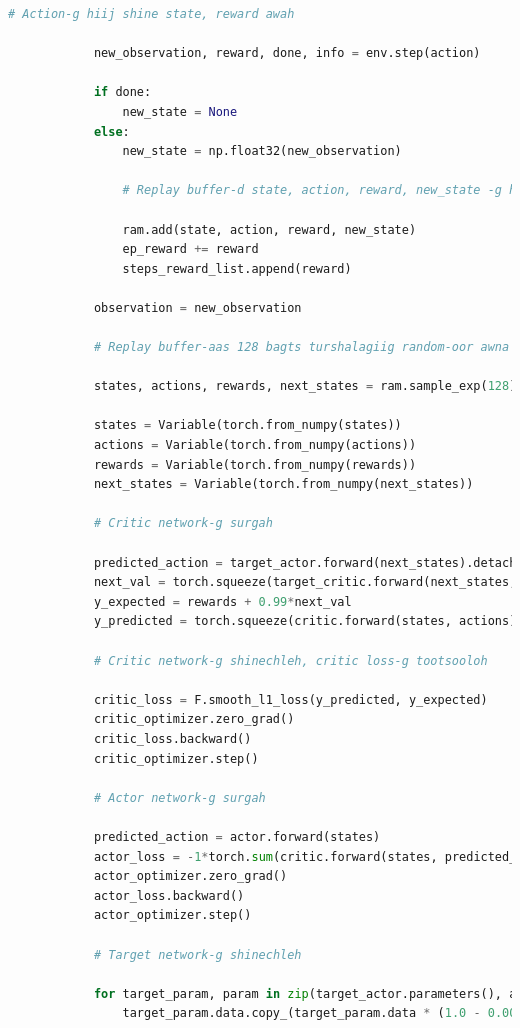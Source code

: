 \documentclass[12pt,A4]{report}
\begin{document}
\begin{lstlisting}[language=Python, caption=main.py, frame=single]
            # Action-g hiij shine state, reward awah

            new_observation, reward, done, info = env.step(action)

            if done:
                new_state = None
            else:
                new_state = np.float32(new_observation)

                # Replay buffer-d state, action, reward, new_state -g hadgalah

                ram.add(state, action, reward, new_state)
                ep_reward += reward
                steps_reward_list.append(reward)

            observation = new_observation

            # Replay buffer-aas 128 bagts turshalagiig random-oor awna

            states, actions, rewards, next_states = ram.sample_exp(128)

            states = Variable(torch.from_numpy(states))
            actions = Variable(torch.from_numpy(actions))
            rewards = Variable(torch.from_numpy(rewards))
            next_states = Variable(torch.from_numpy(next_states))

            # Critic network-g surgah

            predicted_action = target_actor.forward(next_states).detach()
            next_val = torch.squeeze(target_critic.forward(next_states, predicted_action).detach())
            y_expected = rewards + 0.99*next_val
            y_predicted = torch.squeeze(critic.forward(states, actions))

            # Critic network-g shinechleh, critic loss-g tootsooloh
            
            critic_loss = F.smooth_l1_loss(y_predicted, y_expected)
            critic_optimizer.zero_grad()
            critic_loss.backward()
            critic_optimizer.step()

            # Actor network-g surgah

            predicted_action = actor.forward(states)
            actor_loss = -1*torch.sum(critic.forward(states, predicted_action))
            actor_optimizer.zero_grad()
            actor_loss.backward()
            actor_optimizer.step()

            # Target network-g shinechleh

            for target_param, param in zip(target_actor.parameters(), actor.parameters()):
                target_param.data.copy_(target_param.data * (1.0 - 0.001) + param.data * 0.001)


\end{lstlisting}
\end{document}
